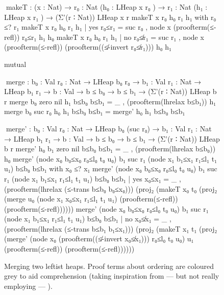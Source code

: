 \begin{sidewaysfigure}
\codefigure\small
\begin{code}
^^^makeT : (x : Nat) →  {r₀  : Nat} (h₀  : LHeap x r₀  ) →
                        {r₁  : Nat} (h₁  : LHeap x r₁  ) → (Σ'(r ∶ Nat)) LHeap x r
makeT x {r₀} h₀ {r₁} h₁ with r₀ ≤? r₁
makeT x {r₀} h₀ {r₁} h₁ | yes  r₀≤r₁  = suc r₀  , node x (proofterm(≤-refl))  r₀≤r₁                          h₁  h₀
makeT x {r₀} h₀ {r₁} h₁ | no   r₀≰r₁  = suc r₁  , node x (proofterm(≤-refl))  (proofterm((≰-invert r₀≰r₁)))  h₀  h₁

mutual

  ^^^merge :  {b₀  : Val} {r₀   : Nat} → LHeap b₀  r₀  →
              {b₁  : Val} {r₁   : Nat} → LHeap b₁  r₁  →
              {b   : Val} → b ≤ b₀ → b ≤ b₁ → (Σ'(r ∶ Nat)) LHeap b r
  merge {b₀} {zero    } nil  h₁ b≤b₀ b≤b₁ = _ , (proofterm(lhrelax b≤b₁)) h₁
  merge {b₀} {suc r₀  } h₀   h₁ b≤b₀ b≤b₁ = merge' h₀ h₁ b≤b₀ b≤b₁

  ^^^merge' :  {b₀  : Val} {r₀   : Nat} → LHeap b₀  (suc r₀)  →
               {b₁  : Val} {r₁   : Nat} → LHeap b₁  r₁        →
               {b   : Val} → b ≤ b₀ → b ≤ b₁ → (Σ'(r ∶ Nat)) LHeap b r
  merge'  h₀                           {b₁} {zero     } nil                          b≤b₀ b≤b₁ = _ , (proofterm(lhrelax b≤b₀)) h₀
  merge'  (node x₀ b₀≤x₀ r₀≤l₀ t₀ u₀)  {b₁} {suc r₁   } (node x₁ b₁≤x₁ r₁≤l₁ t₁ u₁)  b≤b₀ b≤b₁  with x₀ ≤? x₁
  merge'  (node x₀ b₀≤x₀ r₀≤l₀ t₀ u₀)  {b₁} {suc r₁   } (node x₁ b₁≤x₁ r₁≤l₁ t₁ u₁)  b≤b₀ b≤b₁  | yes  x₀≤x₁ =
    _ , (proofterm(lhrelax (≤-trans b≤b₀ b₀≤x₀))) (proj₂ (makeT x₀ t₀ (proj₂ (merge u₀ (node x₁ x₀≤x₁ r₁≤l₁ t₁ u₁) (proofterm(≤-refl)) (proofterm(≤-refl))))))
  merge'  (node x₀ b₀≤x₀ r₀≤l₀ t₀ u₀)  {b₁} {suc r₁   } (node x₁ b₁≤x₁ r₁≤l₁ t₁ u₁)  b≤b₀ b≤b₁  | no   x₀≰x₁ =
    _ , (proofterm(lhrelax (≤-trans b≤b₁ b₁≤x₁))) (proj₂ (makeT x₁ t₁ (proj₂ (merge'  (node x₀ (proofterm((≰-invert x₀≰x₁))) r₀≤l₀ t₀ u₀) u₁ (proofterm(≤-refl)) (proofterm(≤-refl))))))
\end{code}
\caption{Merging two leftist heaps. Proof terms about ordering are coloured grey to aid comprehension (taking inspiration from --- but not really employing --- ).}
\label{fig:merge}
\end{sidewaysfigure}

